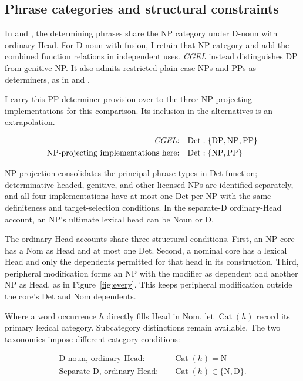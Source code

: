 \documentclass[12pt]{article}
\begin{document}
\subsection{Phrase categories and structural constraints}\label{sec:det-uniform}

In  and , the determining phrases share the NP category under D-noun with ordinary Head. For D-noun with fusion, I retain that NP category and add the combined function relations in independent uses. \textit{CGEL} instead distinguishes DP from genitive NP. It also admits restricted plain-case NPs and PPs as determiners, as in  and  \citep[Ch.~5, §4]{huddleston2002}.

I carry this PP-determiner provision over to the three NP-projecting implementations for this comparison. Its inclusion in the alternatives is an extrapolation.

\[
\begin{aligned}
\text{\textit{CGEL}:} &\quad \mathrm{Det}:\{\mathrm{DP},\mathrm{NP},\mathrm{PP}\} \\
\text{NP-projecting implementations here:} &\quad \mathrm{Det}:\{\mathrm{NP},\mathrm{PP}\}
\end{aligned}
\]

NP projection consolidates the principal phrase types in Det function; determinative-headed, genitive, and other licensed NPs are identified separately, and all four implementations have at most one Det per NP with the same definiteness and target-selection conditions. In the separate-D ordinary-Head account, an NP's ultimate lexical head can be Noun or D.

The ordinary-Head accounts share three structural conditions. First, an NP core has a Nom as Head and at most one Det. Second, a nominal core has a lexical Head and only the dependents permitted for that head in its construction. Third, peripheral modification forms an NP with the modifier as dependent and another NP as Head, as in Figure~\ref{fig:every}. This keeps peripheral modification outside the core's Det and Nom dependents.

Where a word occurrence $h$ directly fills Head in Nom, let $\operatorname{Cat}(h)$ record its primary lexical category. Subcategory distinctions remain available. The two taxonomies impose different category conditions:

\[
\begin{aligned}
\text{D-noun, ordinary Head:} &\quad \operatorname{Cat}(h)=\mathrm{N} \\
\text{Separate D, ordinary Head:} &\quad \operatorname{Cat}(h)\in\{\mathrm{N},\mathrm{D}\}.
\end{aligned}
\]
\end{document}
